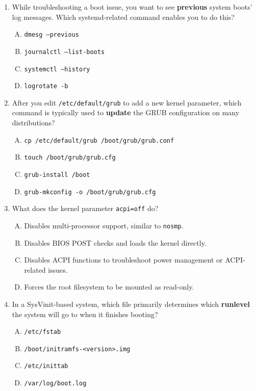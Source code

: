 \documentclass[a4paper]{report}
\begin{document}
\begin{enumerate}[1.]
    \item While troubleshooting a boot issue, you want to see \textbf{previous} system boots’ log messages. Which systemd-related command enables you to do this?
      \begin{enumerate}[A)]
        \item \texttt{dmesg --previous}
        \item \texttt{journalctl --list-boots}
        \item \texttt{systemctl --history}
        \item \texttt{logrotate -b}
      \end{enumerate}
    
    \item After you edit \texttt{/etc/default/grub} to add a new kernel parameter, which command is typically used to \textbf{update} the GRUB configuration on many distributions?
      \begin{enumerate}[A)]
        \item \texttt{cp /etc/default/grub /boot/grub/grub.conf}
        \item \texttt{touch /boot/grub/grub.cfg}
        \item \texttt{grub-install /boot}
        \item \texttt{grub-mkconfig -o /boot/grub/grub.cfg}
      \end{enumerate}
    
    \item What does the kernel parameter \texttt{acpi=off} do?
      \begin{enumerate}[A)]
        \item Disables multi-processor support, similar to \texttt{nosmp}.
        \item Disables BIOS POST checks and loads the kernel directly.
        \item Disables ACPI functions to troubleshoot power management or ACPI-related issues.
        \item Forces the root filesystem to be mounted as read-only.
      \end{enumerate}
    
    \item In a SysVinit-based system, which file primarily determines which \textbf{runlevel} the system will go to when it finishes booting?
      \begin{enumerate}[A)]
        \item \texttt{/etc/fstab}
        \item \texttt{/boot/initramfs-<version>.img}
        \item \texttt{/etc/inittab}
        \item \texttt{/var/log/boot.log}
      \end{enumerate}
    

\end{enumerate}
\end{document}
